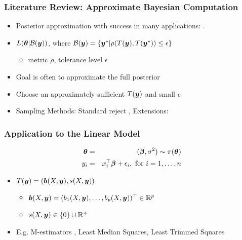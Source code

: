 \documentclass{beamer}
\def\bth{\mbox{\boldmath $\theta$}}
\def\bbeta{\mbox{\boldmath $\beta$}}
\newcommand{\by}{\mbox{\boldmath $y$}}
\newcommand{\bb}{\mbox{\boldmath $b$}}
\begin{document}
\begin{frame}
\frametitle{Literature Review: Approximate Bayesian Computation}
\begin{itemize}
	\item Posterior approximation with success in many applications: \citep{tavare1997, pritchard1999, beaumont2002, marjoram2003, fearnhead2012, drovandi2015}.
	\item $L(\bth| \mathcal{B}(\by))$, where $\mathcal{B}(\by)=\{\by^{*}|\rho(T(\by),T(\by^{*})) \leq \epsilon\}$
	\begin{itemize}
	\item metric $\rho$, tolerance level $\epsilon$
\end{itemize}
\item Goal is often to approximate the full posterior
\item Choose an approximately sufficient \citep{joyce2008} $T(\by)$ and small $\epsilon$
\item Sampling Methods: Standard reject \citep{pritchard1999}, Extensions: \cite{beaumont2009, turner2012, turner2014}
\end{itemize}
\end{frame}


\begin{frame}
\frametitle{Application to the Linear Model}
\begin{eqnarray*}
	\label{LinearModel}
	\bth&=&(\bbeta,\sigma^2) \sim  \pi(\bth) 
	\nonumber\\
	y_i  & =  & x_i^\top \bbeta + \epsilon_i , \mbox{ for } i = 1, \ldots, n 
\end{eqnarray*}

\begin{itemize}
	\item $T(\by) = (\bb(X, \by), s(X, \by))$ 
\begin{itemize}
	\item $\bb(X, \by)= (b_1(X,\by), \dots,b_p(X,\by))^\top\in \mathbb R^{p}$ 
	\item $s(X, \by)\in \{0\} \cup {\mathbb R}^+$
\end{itemize}
	\item E.g. M-estimators \cite{huber1964}, Least Median Squares, Least Trimmed Squares 
\end{itemize}


\end{frame}
\end{document}
